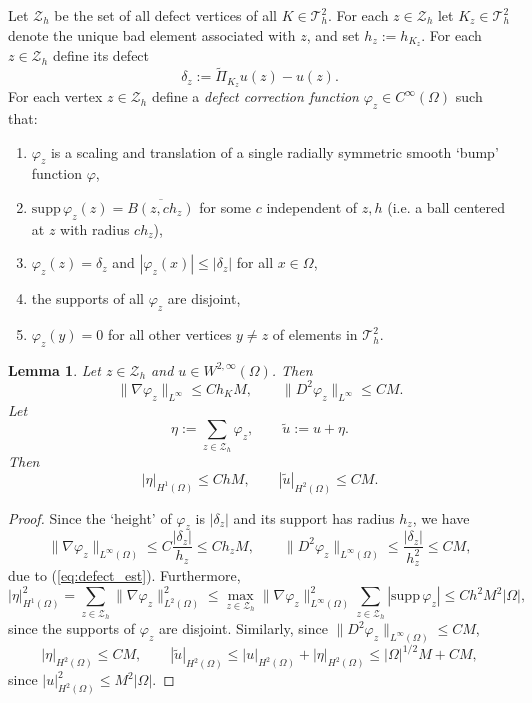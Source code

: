 \documentclass{article}
\newtheorem{lemma}{Lemma}
\begin{document}
Let $\mathcal Z_h$ be the set of all defect vertices of all $K\in\mathcal T_h^2$. For each $z\in\mathcal Z_h$ let
$K_z\in\mathcal T_h^2$ denote the unique bad element associated with $z$, and set $h_z:=h_{K_z}$. For each $z \in \mathcal{Z}_h$ define its defect
\[
\delta_z := \widetilde{\Pi}_{K_z} u(z) - u(z).
\]
For each vertex $z\in\mathcal{Z}_h$ define a \emph{defect correction function} $\varphi_z\in C^\infty(\Omega)$ such that:
\begin{enumerate}
\item  $\varphi_z$ is a scaling and translation of a single radially symmetric smooth `bump' function $\varphi$,
\item $\mathrm{supp}\,\varphi_z(z) = \overline{B(z,ch_z)}$ for some $c$ independent of $z,h$ (i.e. a ball centered at $z$ with radius $ch_z$),
\item $\varphi_z(z)=\delta_z$ and $|\varphi_z(x)|\le |\delta_z|$ for all $x\in\Omega$,
\item the supports of all $\varphi_z$ are disjoint,
\item $\varphi_z(y) = 0$ for all other vertices $y \neq z$ of elements in $\mathcal{T}_h^2$.
\end{enumerate}

\begin{lemma}
\label{lem:defect_correction}
Let $z\in\mathcal{Z}_h$ and $u\in W^{2,\infty}(\Omega)$. Then
\[
\|\nabla \varphi_z\|_{L^\infty} \le C h_K M,
\qquad
\|D^2 \varphi_z\|_{L^\infty} \le C M.
\]
Let
\[
\eta := \sum_{z \in \mathcal{Z}_h} \varphi_z,
\qquad
\widetilde{u} := u + \eta.
\]
Then
\[
|\eta|_{H^1(\Omega)} \le C h M,
\qquad
|\widetilde{u}|_{H^2(\Omega)} \le C M.
\]
\end{lemma}
\begin{proof}
Since the `height' of $\varphi_z$ is $|\delta_z|$ and its support has radius $h_z$, we have
\[
\|\nabla \varphi_z\|_{L^\infty(\Omega)} \le C \frac{|\delta_z|}{h_z}\leq Ch_z M,
\qquad
\|D^2 \varphi_z\|_{L^\infty(\Omega)} \leq \frac{|\delta_z|}{h_z^2} \leq C M,
\]
due to (\ref{eq:defect_est}).
Furthermore,
\[
|\eta|_{H^1(\Omega)}^2 =\sum_{z\in\mathcal{Z}_h} \|\nabla\varphi_z\|_{L^2(\Omega)}^2 \leq \max_{z\in\mathcal{Z}_h}\|\nabla\varphi_z\|_{L^\infty(\Omega)}^2 \sum_{z\in\mathcal{Z}_h} |\mathrm{supp}\,\varphi_z| \leq C h^2 M^2|\Omega|,
\]
since the supports of $\varphi_z$ are disjoint. Similarly, since $\|D^2 \varphi_z\|_{L^\infty(\Omega)} \leq C M$,
\[
|\eta|_{H^2(\Omega)} \le C M,\qquad |\widetilde{u}|_{H^2(\Omega)} \le |u|_{H^2(\Omega)} +|\eta|_{H^2(\Omega)}\leq |\Omega|^{1/2}M + C M,
\]
since $|u|_{H^2(\Omega)}^2\leq M^2|\Omega|$.
\end{proof}
\end{document}

